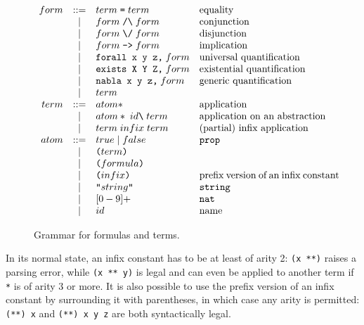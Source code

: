 \begin{figure}
\[\begin{array}{rclp{5cm}}
form &::=& term\;\verb.=.\;term         & equality \\
     & | & form\;\verb./\.\;form        & conjunction \\
     & | & form\;\verb.\/.\;form        & disjunction \\
     & | & form\;\verb.->.\;form        & implication \\
     & | & \verb.forall x y z,.\;form   & universal quantification \\
     & | & \verb.exists X Y Z,.\;form   & existential quantification \\
     & | & \verb.nabla x y z,.\;form    & generic quantification \\
     & | & term                         & \\
term &::=& atom*                        & application \\
     & | & atom*\;id\verb.\.\;term      & application on an
                                          abstraction \\
     & | & term\;infix\;term            & (partial) infix application \\
atom &::=& true\;|\;false               & {\tt prop} \\
     & | & \verb.(.term\verb.).         & \\
     & | & \verb.(.formula\verb.).      & \\
     & | & \verb.(.infix\verb.).        & prefix version of an infix
                                          constant\\
     & | & \verb.".string\verb.".       & {\tt string} \\
     & | & [0-9]+                       & {\tt nat} \\
     & | & id                           & name \\
\end{array}\]
\caption{Grammar for formulas and terms.}
\label{concrete}
\end{figure}

In its normal state, an infix constant has to be at least of arity 2:
{\tt (x **)} raises a parsing error, while {\tt (x ** y)} is legal and
can even be applied to another term if {\tt **} is of arity 3 or more.
It is also possible to use the prefix version of an infix constant by
surrounding it with parentheses, in which case any arity is permitted:
{\tt (**) x} and {\tt (**) x y z} are both syntactically legal.

